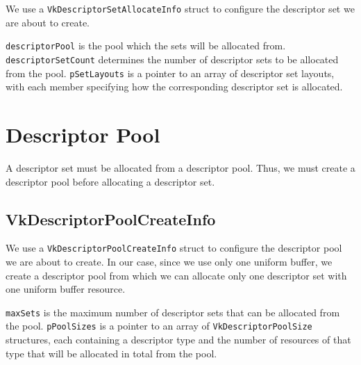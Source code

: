 We use a \texttt{VkDescriptorSetAllocateInfo} struct to configure the descriptor
set we are about to create.

\begin{minipage}{\linewidth}{\noindent}
    
\end{minipage}

\texttt{descriptorPool} is the pool which the sets will be allocated from.
\texttt{descriptorSetCount} determines the number of descriptor sets to be
allocated from the pool.
\texttt{pSetLayouts} is a pointer to an array of descriptor set layouts,
with each member specifying how the corresponding descriptor set is allocated.

\section{Descriptor Pool}

A descriptor set must be allocated from a descriptor pool.
Thus, we must create a descriptor pool before allocating a descriptor set.

\begin{minipage}{\linewidth}{\noindent}
    
\end{minipage}

\subsection{VkDescriptorPoolCreateInfo}

We use a \texttt{VkDescriptorPoolCreateInfo} struct to configure the descriptor
pool we are about to create.
In our case, since we use only one uniform buffer, we create a descriptor pool
from which we can allocate only one descriptor set with one uniform buffer resource.

\begin{minipage}{\linewidth}{\noindent}
    
\end{minipage}

\texttt{maxSets} is the maximum number of descriptor sets that can be allocated
from the pool.
\texttt{pPoolSizes} is a pointer to an array of \texttt{VkDescriptorPoolSize}
structures, each containing a descriptor type and the number of resources
of that type that will be allocated in total from the pool.


